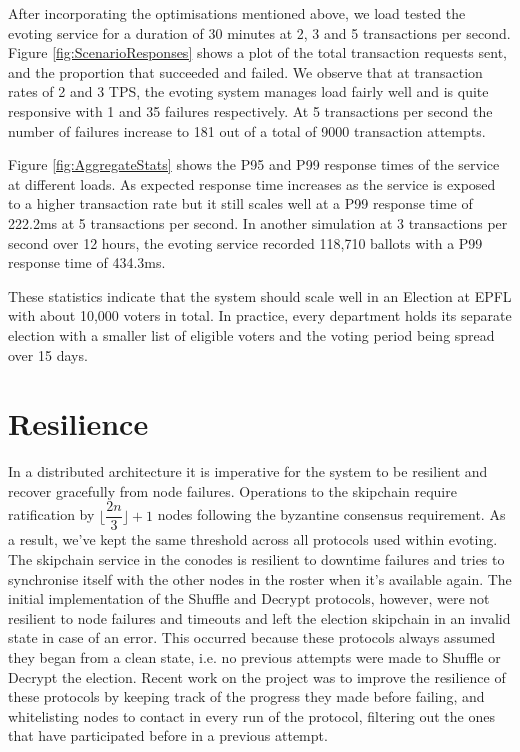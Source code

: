 After incorporating the optimisations mentioned above, we load tested the evoting service for a duration of 30 minutes at 2, 3 and 5 transactions per second. Figure \ref{fig:ScenarioResponses} shows a plot of the total transaction requests sent, and the proportion that succeeded and failed. We observe that at transaction rates of 2 and 3 TPS, the evoting system manages load fairly well and is quite responsive with 1 and 35 failures respectively. At 5 transactions per second the number of failures increase to 181 out of a total of 9000 transaction attempts.

Figure \ref{fig:AggregateStats} shows the P95 and P99 response times of the service at different loads. As expected response time increases as the service is exposed to a higher transaction rate but it still scales well at a P99 response time of 222.2ms at 5 transactions per second.  In another simulation at 3 transactions per second over 12 hours, the evoting service recorded 118,710 ballots with a P99 response time of 434.3ms.

These statistics indicate that the system should scale well in an Election at EPFL with about 10,000 voters in total. In practice, every department holds its separate election with a smaller list of eligible voters and the voting period being spread over 15 days.

\section{Resilience}

In a distributed architecture it is imperative for the system to be resilient and recover gracefully from node failures. Operations to the skipchain require ratification by \( \lfloor\dfrac{2n}{3}\rfloor + 1 \) nodes following the byzantine consensus requirement. As a result, we've kept the same threshold across all protocols used within evoting. The skipchain service in the conodes is resilient to downtime failures and tries to synchronise itself with the other nodes in the roster when it's available again. The initial implementation of the Shuffle and Decrypt protocols, however, were not resilient to node failures and timeouts and left the election skipchain in an invalid state in case of an error. This occurred because these protocols always assumed they began from a clean state, i.e. no previous attempts were made to Shuffle or Decrypt the election. Recent work on the project was to improve the resilience of these protocols by keeping track of the progress they made before failing, and whitelisting nodes to contact in every run of the protocol, filtering out the ones that have participated before in a previous attempt.